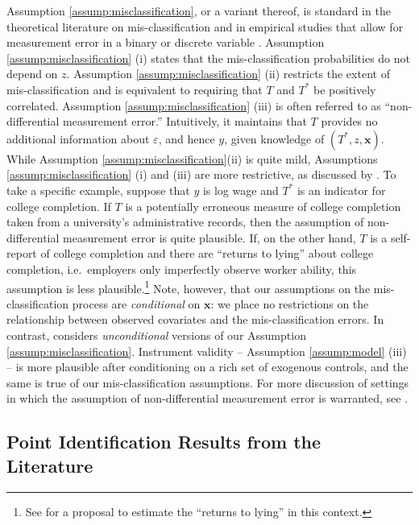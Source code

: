 Assumption \ref{assump:misclassification}, or a variant thereof, is standard in the theoretical literature on mis-classification \citep{Mahajan,BBS,FL,Lewbel,hu2008} and in empirical studies that allow for measurement error in a binary or discrete variable \citep{KRS,hu2013,Batt}.
Assumption \ref{assump:misclassification} (i) states that the mis-classification probabilities do not depend on $z$.
Assumption \ref{assump:misclassification} (ii) restricts the extent of mis-classification and is equivalent to requiring that $T$ and $T^*$ be positively correlated.
Assumption \ref{assump:misclassification} (iii) is often referred to as ``non-differential measurement error.''
Intuitively, it maintains that $T$ provides no additional information about $\varepsilon$, and hence $y$, given knowledge of $(T^*,z,\mathbf{x})$.
While Assumption \ref{assump:misclassification}(ii) is quite mild, Assumptions \ref{assump:misclassification} (i) and (iii) are more restrictive, as discussed by \cite{Bound2001}.
To take a specific example, suppose that $y$ is log wage and $T^*$ is an indicator for college completion.
If $T$ is a potentially erroneous measure of college completion taken from a university's administrative records, then the assumption of non-differential measurement error is quite plausible.
If, on the other hand, $T$ is a self-report of college completion and there are ``returns to lying'' about college completion, i.e.\ employers only imperfectly observe worker ability, this assumption is less plausible.\footnote{See \cite{huLewbel} for a proposal to estimate the ``returns to lying'' in this context.}
Note, however, that our assumptions on the mis-classification process are \emph{conditional} on $\mathbf{x}$: we place no restrictions on the relationship between observed covariates and the mis-classification errors. 
In contrast, \cite{Bound2001} considers \emph{unconditional} versions of our Assumption \ref{assump:misclassification}.
Instrument validity -- Assumption \ref{assump:model} (iii) -- is more plausible after conditioning on a rich set of exogenous controls, and the same is true of our mis-classification assumptions.
For more discussion of settings in which the assumption of non-differential measurement error is warranted, see \cite{carroll2006}.


\subsection{Point Identification Results from the Literature}
\label{sec:ident_literature}

